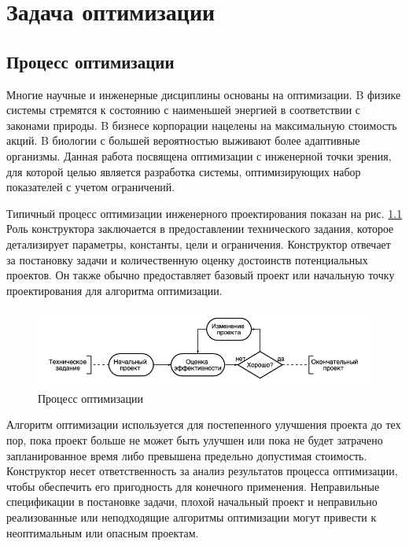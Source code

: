 \chapter{Задача оптимизации}
\label{ch:chapter1}

\section{Процесс оптимизации}

Многие научные и инженерные дисциплины основаны на оптимизации. B физике системы стремятся к состоянию с наименьшей энергией в соответствии с законами природы. B бизнесе корпорации нацелены на максимальную стоимость акций. B биологии с большей вероятностью выживают более адаптивные организмы. Данная работа посвящена оптимизации с инженерной точки зрения, для которой целью является разработка системы, оптимизирующих набор показателей с учетом ограничений.

Типичный процесс оптимизации инженерного проектирования показан на рис. \ref{fig:diagram_1} Роль конструктора заключается в предоставлении технического задания, которое детализирует параметры, константы, цели и ограничения. Конструктор отвечает за постановку задачи и количественную оценку достоинств потенциальных проектов. Он также обычно предоставляет базовый проект или начальную точку проектирования для алгоритма оптимизации.

\begin{figure}[ht]
 \centering
		\includegraphics[height = 3 cm, keepaspectratio]{../assets/images/1_1_1diagram.png}
		\caption{ Процесс оптимизации }
		\label{fig:diagram_1}
	\end{figure}

Алгоритм оптимизации используется для постепенного улучшения проекта до тех пор, пока проект больше не может быть улучшен или пока не будет затрачено запланированное время либо превышена предельно допустимая стоимость. Конструктор несет ответственность за анализ результатов процесса оптимизации, чтобы обеспечить его пригодность для конечного применения. Неправильные спецификации в постановке задачи, плохой начальный проект и неправильно реализованные или неподходящие алгоритмы оптимизации могут привести к неоптимальным или опасным проектам.

